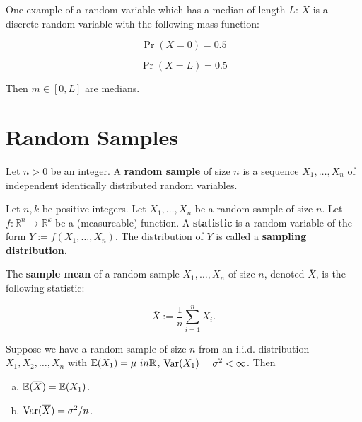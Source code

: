 \begin{remark} One example of a random variable which has a median of length \(L\): \(X\) is a discrete random variable with the following mass function:

\[
\Pr(X = 0) = 0.5
\]

\[
\Pr(X = L) = 0.5
\]

Then \(m \in [0, L]\) are medians.

\end{remark}

\section{Random Samples}

\begin{definition} Let \(n >0\) be an integer.  A \textbf{random sample} of size \(n\) is a sequence \(X_1, \ldots, X_n\) of independent identically distributed random variables.

\end{definition}

\begin{definition} Let \(n, k\) be positive integers. Let \(X_1, \ldots, X_n\) be a random sample of size \(n\). Let \(f: \mathbb{R}^n \to \mathbb{R}^k\) be a (measureable) function. A \textbf{statistic} is a random variable of the form \(Y:= f(X_1, \ldots, X_n)\). The distribution of \(Y\) is called a \textbf{sampling distribution.}

\end{definition}

\begin{definition} The \textbf{sample mean} of a random sample \(X_1, \ldots, X_n\) of size \(n\), denoted \(\overline{X}\), is the following statistic:

\[
\overline{X} := \frac{1}{n} \sum_{i=1}^n X_i.
\]

\end{definition}

\begin{proposition}\label{mathstats.sample.mean.props} Suppose we have a random sample of size \(n\) from an i.i.d. distribution \(X_1, X_2, \ldots, X_n\) with \(\E(X_1) = \mu \ in \mathbb{R}\), \(\Var(X_1) = \sigma^2 < \infty\). Then

\begin{enumerate}[(a)]

\item \(\E(\overline{X}) = \E(X_1)\).

\item \( \Var(\overline{X}) = \sigma^2/n\).

\end{enumerate}

\end{proposition}

